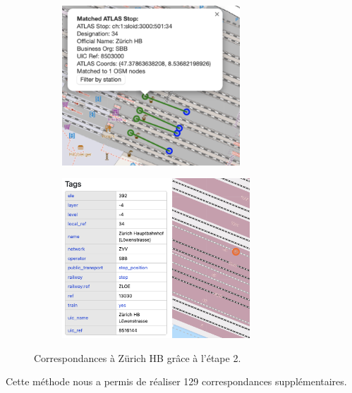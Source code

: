 \begin{figure}[h]
    \centering
    \begin{subfigure}[b]{0.45\textwidth}
        \centering
        \includegraphics[height=6cm]{../figures/correspondances/distance_2.png}
        \label{fig:zurich_atlas}
    \end{subfigure}
    \hspace{-0.2cm}  %
    \begin{subfigure}[b]{0.45\textwidth}
        \centering
        \includegraphics[height=6cm]{../figures/correspondances/osm_distance_2.png}
        \label{fig:zurich_osm}
    \end{subfigure}
    \caption[Correspondances – Zürich HB (étape 2)]{Correspondances à Zürich HB grâce à l'étape 2.}
    \label{fig:zurich_distance_2}
\end{figure}

Cette méthode nous a permis de réaliser 129 correspondances supplémentaires.

